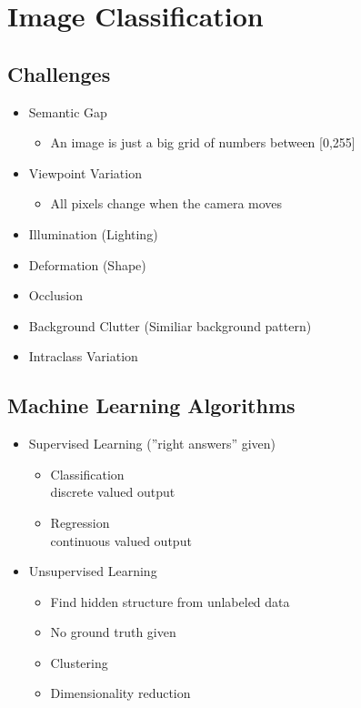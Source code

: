 \documentclass{scrartcl}
\begin{document}
\pagebreak
\section{Image Classification}

\subsection{Challenges}

\begin{itemize}
	\item Semantic Gap
	\begin{itemize}
		\item An image is just a big grid of numbers between [0,255]
	\end{itemize}
	\item Viewpoint Variation
	\begin{itemize}
		\item All pixels change when the camera moves
	\end{itemize}
	\item Illumination (Lighting)
	\item Deformation (Shape)
	\item Occlusion
	\item Background Clutter (Similiar background pattern)
	\item Intraclass Variation
\end{itemize}

\subsection{Machine Learning Algorithms}

\begin{itemize}
	\item Supervised Learning (''right answers'' given)
	\begin{itemize}
		\item Classification \\
		discrete valued output
		\item Regression \\
		continuous valued output
	\end{itemize}
	\item Unsupervised Learning
	\begin{itemize}
		\item Find hidden structure from unlabeled data
		\item No ground truth given
		\item Clustering
		\item Dimensionality reduction
	\end{itemize}
\end{itemize}
\end{document}
